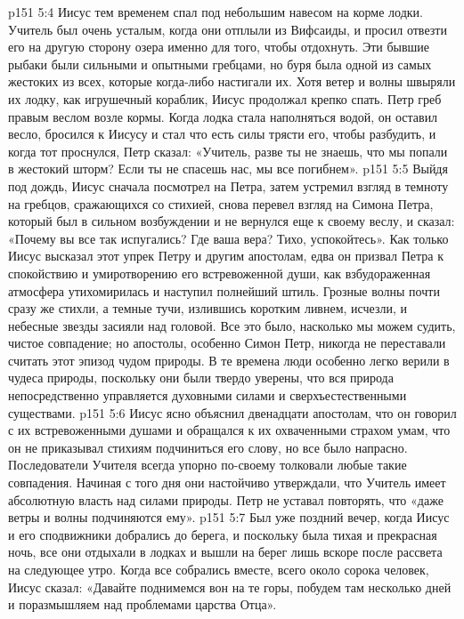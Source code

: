 \vs p151 5:4 Иисус тем временем спал под небольшим навесом на корме лодки. Учитель был очень усталым, когда они отплыли из Вифсаиды, и просил отвезти его на другую сторону озера именно для того, чтобы отдохнуть. Эти бывшие рыбаки были сильными и опытными гребцами, но буря была одной из самых жестоких из всех, которые когда\hyp{}либо настигали их. Хотя ветер и волны швыряли их лодку, как игрушечный кораблик, Иисус продолжал крепко спать. Петр греб правым веслом возле кормы. Когда лодка стала наполняться водой, он оставил весло, бросился к Иисусу и стал что есть силы трясти его, чтобы разбудить, и когда тот проснулся, Петр сказал: «Учитель, разве ты не знаешь, что мы попали в жестокий шторм? Если ты не спасешь нас, мы все погибнем».
\vs p151 5:5 Выйдя под дождь, Иисус сначала посмотрел на Петра, затем устремил взгляд в темноту на гребцов, сражающихся со стихией, снова перевел взгляд на Симона Петра, который был в сильном возбуждении и не вернулся еще к своему веслу, и сказал: «Почему вы все так испугались? Где ваша вера? Тихо, успокойтесь». Как только Иисус высказал этот упрек Петру и другим апостолам, едва он призвал Петра к спокойствию и умиротворению его встревоженной души, как взбудораженная атмосфера утихомирилась и наступил полнейший штиль. Грозные волны почти сразу же стихли, а темные тучи, излившись коротким ливнем, исчезли, и небесные звезды засияли над головой. Все это было, насколько мы можем судить, чистое совпадение; но апостолы, особенно Симон Петр, никогда не переставали считать этот эпизод чудом природы. В те времена люди особенно легко верили в чудеса природы, поскольку они были твердо уверены, что вся природа непосредственно управляется духовными силами и сверхъестественными существами.
\vs p151 5:6 Иисус ясно объяснил двенадцати апостолам, что он говорил с их встревоженными душами и обращался к их охваченными страхом умам, что он не приказывал стихиям подчиниться его слову, но все было напрасно. Последователи Учителя всегда упорно по\hyp{}своему толковали любые такие совпадения. Начиная с того дня они настойчиво утверждали, что Учитель имеет абсолютную власть над силами природы. Петр не уставал повторять, что «даже ветры и волны подчиняются ему».
\vs p151 5:7 Был уже поздний вечер, когда Иисус и его сподвижники добрались до берега, и поскольку была тихая и прекрасная ночь, все они отдыхали в лодках и вышли на берег лишь вскоре после рассвета на следующее утро. Когда все собрались вместе, всего около сорока человек, Иисус сказал: «Давайте поднимемся вон на те горы, побудем там несколько дней и поразмышляем над проблемами царства Отца».

